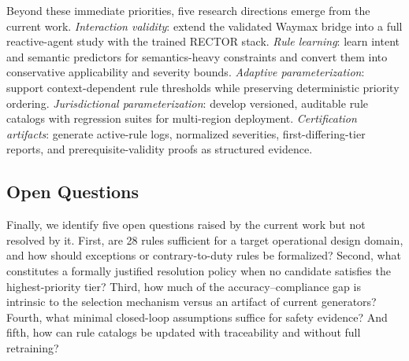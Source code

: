 Beyond these immediate priorities, five research directions emerge from the current work.  \emph{Interaction validity}: extend the validated Waymax bridge into a full reactive-agent study with the trained RECTOR stack.  \emph{Rule learning}: learn intent and semantic predictors for semantics-heavy constraints and convert them into conservative applicability and severity bounds.  \emph{Adaptive parameterization}: support context-dependent rule thresholds while preserving deterministic priority ordering.  \emph{Jurisdictional parameterization}: develop versioned, auditable rule catalogs with regression suites for multi-region deployment.  \emph{Certification artifacts}: generate active-rule logs, normalized severities, first-differing-tier reports, and prerequisite-validity proofs as structured evidence.

\subsection{Open Questions}
\label{subsec:open_questions}

Finally, we identify five open questions raised by the current work but not resolved by it.  First, are 28 rules sufficient for a target operational design domain, and how should exceptions or contrary-to-duty rules be formalized?  Second, what constitutes a formally justified resolution policy when no candidate satisfies the highest-priority tier?  Third, how much of the accuracy--compliance gap is intrinsic to the selection mechanism versus an artifact of current generators?  Fourth, what minimal closed-loop assumptions suffice for safety evidence?  And fifth, how can rule catalogs be updated with traceability and without full retraining?
